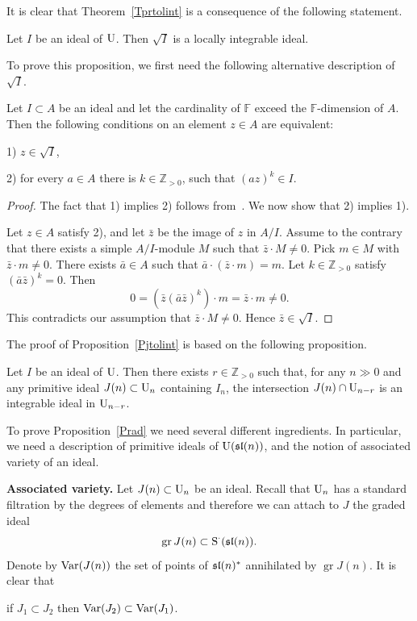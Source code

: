 \documentclass[10pt]{amsart}\oddsidemargin -1mm \evensidemargin -1mm \topmargin -15mm\headheight5mm \headsep 3.5mm \textheight 245mm\textwidth 170mm %
\begin{document}
It is clear that Theorem~\ref{Tprtolint} is a consequence of the following statement.
\begin{proposition}\label{Pjtolint} Let $I$ be an ideal of $\operatorname{\mathrm{U}}$. Then $\sqrt I$ is a locally integrable ideal.\end{proposition}
To prove this proposition, we first need the following alternative description of $\sqrt I$.
\begin{lemma}\label{Lalg} Let $I\subset A$ be an ideal and let the cardinality of $\mathbb F$ exceed the $\mathbb F$-dimension of $A$. Then the following conditions on an element $z\in A$ are equivalent:

1) $z\in \sqrt I$,

2) for every $a\in A$ there is $k\in\mathbb Z_{>0}$, such that $(az)^k\in I$.\end{lemma}
\begin{proof} The fact that 1) implies 2) follows from~\cite[p.~344,~Corollary~1.8]{MCR}. We now show that 2) implies 1).

Let $z\in A$ satisfy 2), and let $\bar z$ be the image of $z$ in $A/I$. Assume to the contrary that there exists a simple $A/I$-module $M$ such that $\bar z\cdot M\ne0$. Pick $m\in M$  with $\bar z\cdot m\ne0$. There exists $\bar a\in A$ such that $\bar a\cdot(\bar z\cdot m)=m$. Let $k\in\mathbb Z_{>0}$ satisfy $(\bar a\bar z)^k=0$. Then
$$0=(\bar z(\bar a\bar z)^k)\cdot m=\bar z\cdot m\ne0.$$
This contradicts our assumption that $\bar z\cdot M\ne0$. Hence $\bar z\in\sqrt I$.
\end{proof}
The proof of Proposition~\ref{Pjtolint} is based on the following proposition.
\begin{proposition}\label{Prad} Let $I$ be an ideal of $\operatorname{\mathrm{U}}$. Then there exists $r\in\mathbb Z_{>0}$ such that, for any $n\gg 0$ and any primitive ideal $J(n)\subset \operatorname{\mathrm{U}}_n$ containing $I_n$, the intersection $J(n)\cap\operatorname{\mathrm{U}}_{n-r}$ is an integrable ideal in $\operatorname{\mathrm{U}}_{n-r}$.\end{proposition}
To prove Proposition~\ref{Prad} we need several different ingredients. In particular, we need a description of primitive ideals of $\operatorname{\mathrm{U}}(\frak{sl}(n))$, and the notion of associated variety of an ideal.

{\bf Associated variety.} Let $J(n)\subset \operatorname{\mathrm{U}}_n$ be an ideal. Recall that $\operatorname{\mathrm{U}}_n$ has a standard filtration by the degrees of elements and therefore we can attach to $J$ the graded ideal $$\operatorname{gr} J(n)\subset\operatorname{\mathrm{S}}^\cdot(\frak{sl}(n)).$$
Denote by $\operatorname{\mathrm{Var}}(J(n))$ the set of points of $\frak{sl}(n)^*$ annihilated by $\operatorname{gr} J(n)$. It is clear that \begin{center}if $J_1\subset J_2$ then $\operatorname{\mathrm{Var}}(J_2)\subset\operatorname{\mathrm{Var}}(J_1)$.\end{center}
\end{document}
